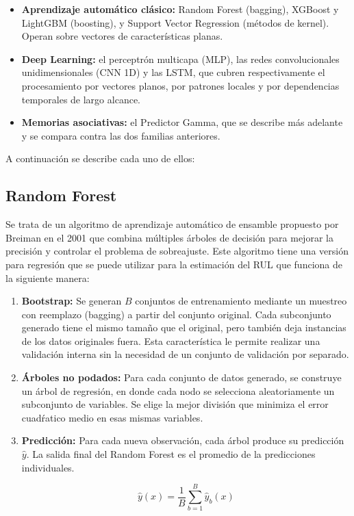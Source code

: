 \begin{itemize}
    \item \textbf{Aprendizaje automático clásico:} Random Forest (bagging), XGBoost y LightGBM (boosting), y Support Vector Regression (métodos de kernel). Operan sobre vectores de características planas.

    \item \textbf{Deep Learning:} el perceptrón multicapa (MLP), las redes convolucionales unidimensionales (CNN 1D) y las LSTM, que cubren respectivamente el procesamiento por vectores planos, por patrones locales y por dependencias temporales de largo alcance.

    \item \textbf{Memorias asociativas:} el Predictor Gamma, que se describe más adelante y se compara contra las dos familias anteriores.
\end{itemize}

A continuación se describe cada uno de ellos:

\subsection{Random Forest}

Se trata de un algoritmo de aprendizaje automático de ensamble propuesto por Breiman en el 2001 \cite{breiman2001} que combina múltiples árboles de decisión para mejorar la precisión y controlar el problema de sobreajuste. Este algoritmo tiene una versión para regresión que se puede utilizar para la estimación del RUL que funciona de la siguiente manera:

\begin{enumerate}
    \item \textbf{Bootstrap:}  Se generan $B$ conjuntos de entrenamiento mediante un muestreo con reemplazo (bagging) a partir del conjunto original. Cada subconjunto generado tiene el mismo tamaño que el original, pero también deja instancias de los datos originales fuera. Esta característica le permite realizar una validación interna sin la necesidad de un conjunto de validación por separado.

    \item \textbf{Árboles no podados:}  Para cada conjunto de datos generado, se construye un árbol de regresión, en donde cada nodo se selecciona aleatoriamente un subconjunto de variables. Se elige la mejor división que minimiza el error cuadŕatico medio en esas mismas variables.

    \item \textbf{Predicción:}  Para cada nueva observación, cada árbol produce su predicción $\hat{y}$. La salida final del Random Forest es el promedio de la predicciones individuales.

\[
\hat{y}(x) = \frac{1}{B} \sum_{b=1}^{B} \hat{y}_b(x)
\]
\end{enumerate}


